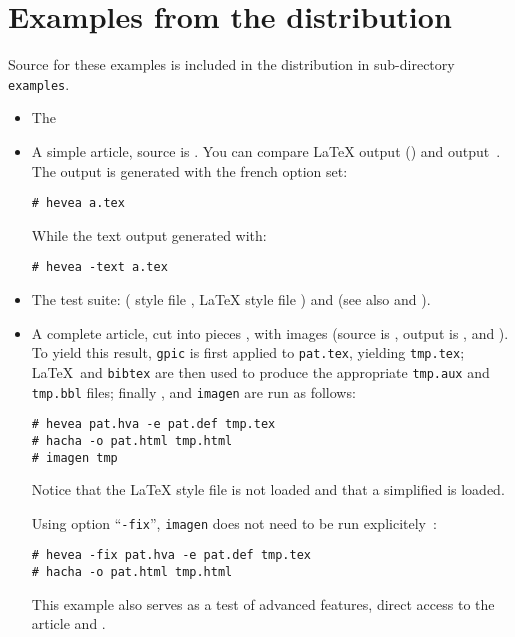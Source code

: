 \documentclass{article}
\begin{document}
\section*{Examples from the distribution}
Source for these examples is included in the distribution in
sub-directory \texttt{examples}.
\begin{itemize}
\item The 

\item A simple article,  source is .
You can compare \LaTeX{} output () and \hevea{} output~. The \html{} output is
generated with the french option set:
\begin{verbatim}
# hevea a.tex
\end{verbatim}
While the text output generated with:
\begin{verbatim}
# hevea -text a.tex
\end{verbatim}

\item The test suite: 
(\hevea{} style file , \LaTeX{} style file
)
and  (see
also  and ).

\item A complete article, cut into pieces , with images (source is
, output is , 
 and ). To yield this result, \verb+gpic+ is first
applied to \verb+pat.tex+, yielding \verb+tmp.tex+; \LaTeX\ and
\texttt{bibtex} are then used to produce the appropriate \verb+tmp.aux+ and
\verb+tmp.bbl+ files; finally \hevea{}, \hacha{} and \texttt{imagen}
are run as follows:
\begin{verbatim}
# hevea pat.hva -e pat.def tmp.tex
# hacha -o pat.html tmp.html
# imagen tmp
\end{verbatim}
Notice that the \LaTeX{} style file  is not loaded and
that a simplified  is loaded.

Using option ``\texttt{-fix}'', \texttt{imagen} does not need to be
run explicitely~:
\begin{verbatim}
# hevea -fix pat.hva -e pat.def tmp.tex
# hacha -o pat.html tmp.html
\end{verbatim}

This example also serves as a test of \hacha{} advanced features,
direct access to the article 
and .


\end{itemize}
\end{document}

